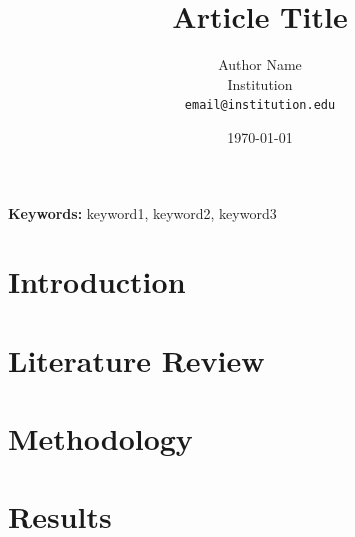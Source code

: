 \documentclass[12pt,a4paper]{article}
\title{Article Title}
\author{Author Name \\ \small Institution \\ \small \texttt{email@institution.edu}}
\date{\today}
\begin{document}
\maketitle

\begin{abstract}
\end{abstract}

\textbf{Keywords:} keyword1, keyword2, keyword3

\section{Introduction}

\section{Literature Review}

\section{Methodology}

\section{Results}
\end{document}
